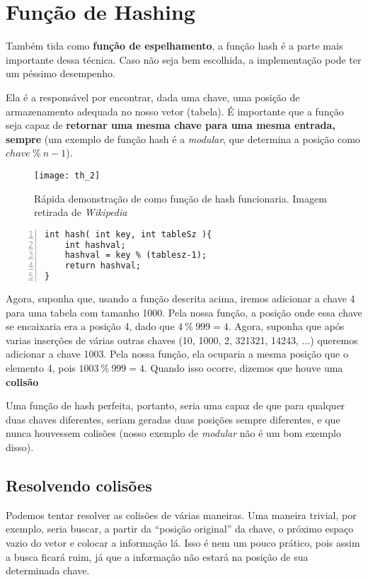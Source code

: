 \documentclass[12pt, a4paper]{article}
\begin{document}
\section{Função de Hashing}
\label{sec:hash}

Também tida como \textbf{função de espelhamento}, a função hash é a parte mais importante dessa técnica. Caso não seja bem escolhida, a implementação pode ter um péssimo desempenho.

Ela é a responsável por encontrar, dada uma chave, uma posição de armazenamento adequada no nosso vetor (tabela). É importante que a função seja capaz de \textbf{retornar uma mesma chave para uma mesma entrada, sempre} (um exemplo de função hash é a \textit{modular}, que determina a posição como $chave~\%~n-1$). 

\begin{figure}[!h]
\centering
\texttt{[image: th\_2]}
\caption{Rápida demonstração de como função de hash funcionaria. Imagem retirada de \textit{Wikipedia}\cite{wiki:hash}}
\label{hash2}
\end{figure}

\begin{lstlisting}[frame=single, captionpos=b, numbers=left]
int hash( int key, int tableSz ){
	int hashval;
	hashval = key % (tablesz-1);
	return hashval;
}
\end{lstlisting}

Agora, suponha que, usando a função descrita acima, iremos adicionar a chave 4 para uma tabela com tamanho 1000. Pela nossa função, a posição onde essa chave se encaixaria era a posição 4, dado que $4~\%~999 = 4$. Agora, suponha que após varias inserções de várias outras chaves (10, 1000, 2, 321321, 14243, ...) queremos adicionar a chave 1003. Pela nossa função, ela ocuparia a mesma posição que o elemento 4, pois $1003~\%~999 = 4$. Quando isso ocorre, dizemos que houve uma \textbf{colisão}

Uma função de hash perfeita, portanto, seria uma capaz de que para qualquer duas chaves diferentes, seriam geradas duas posições sempre diferentes, e que nunca houvessem colisões (nosso exemplo de \textit{modular} não é um bom exemplo disso).

\subsection{Resolvendo colisões}
Podemos tentar resolver as colisões de várias maneiras. Uma maneira trivial, por exemplo, seria buscar, a partir da ``posição original'' da chave, o próximo espaço vazio do vetor e colocar a informação lá. Isso é nem um pouco prático, pois assim a busca ficará ruim, já que a informação não estará na posição de sua determinada chave.
\end{document}
